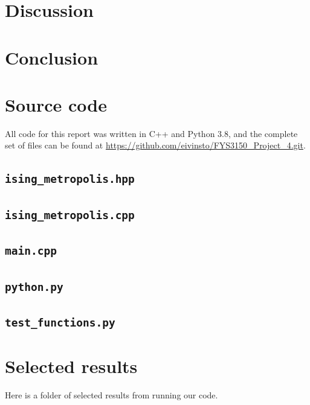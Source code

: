\documentclass[reprint,english,notitlepage]{revtex4-1}  %
\begin{document}
\newpage

\section{Discussion} \label{sec:V}


\newpage

\section{Conclusion} \label{sec:VI}


\onecolumngrid
{}
\newpage
\twocolumngrid

\appendix
\section{Source code} \label{A}
All code for this report was written in C++ and Python 3.8, and the complete set of files can be found at
\url{https://github.com/eivinsto/FYS3150_Project_4.git}.

\cprotect\subsection{\verb+ising_metropolis.hpp+} \label{A.1}

\cprotect\subsection{\verb+ising_metropolis.cpp+} \label{A.2}

\cprotect\subsection{\verb+main.cpp+} \label{A.3}

\cprotect\subsection{\verb+python.py+} \label{A.4}

\cprotect\subsection{\verb+test_functions.py+} \label{A.5}

\newpage
\section{Selected results} \label{B}
Here is a folder of selected results from running our code.
\end{document}
